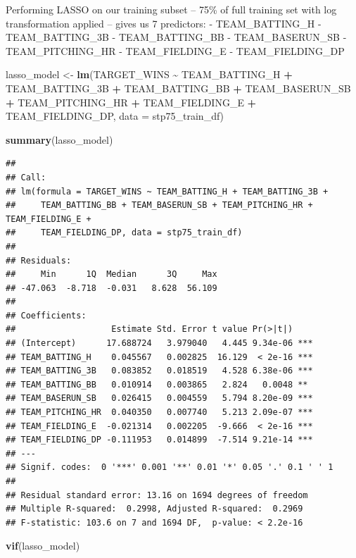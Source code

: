 \documentclass[
]{article}
\newenvironment{Shaded}{\begin{snugshade}}{\end{snugshade}}
\newcommand{\AttributeTok}[1]{\textcolor[rgb]{0.13,0.29,0.53}{#1}}
\newcommand{\FunctionTok}[1]{\textcolor[rgb]{0.13,0.29,0.53}{\textbf{#1}}}
\newcommand{\NormalTok}[1]{#1}
\newcommand{\OtherTok}[1]{\textcolor[rgb]{0.56,0.35,0.01}{#1}}
\newcommand{\SpecialCharTok}[1]{\textcolor[rgb]{0.81,0.36,0.00}{\textbf{#1}}}
\begin{document}
Performing LASSO on our training subset -- 75\% of full training set
with log transformation applied -- gives us 7 predictors: -
TEAM\_BATTING\_H - TEAM\_BATTING\_3B - TEAM\_BATTING\_BB -
TEAM\_BASERUN\_SB - TEAM\_PITCHING\_HR - TEAM\_FIELDING\_E -
TEAM\_FIELDING\_DP

\begin{Shaded}
\begin{Highlighting}[]
\NormalTok{lasso\_model }\OtherTok{\textless{}{-}} \FunctionTok{lm}\NormalTok{(TARGET\_WINS }\SpecialCharTok{\textasciitilde{}}\NormalTok{ TEAM\_BATTING\_H }\SpecialCharTok{+}\NormalTok{ TEAM\_BATTING\_3B }\SpecialCharTok{+}\NormalTok{ TEAM\_BATTING\_BB }\SpecialCharTok{+}\NormalTok{ TEAM\_BASERUN\_SB }\SpecialCharTok{+}\NormalTok{ TEAM\_PITCHING\_HR }\SpecialCharTok{+}\NormalTok{ TEAM\_FIELDING\_E }\SpecialCharTok{+}\NormalTok{ TEAM\_FIELDING\_DP, }\AttributeTok{data =}\NormalTok{ stp75\_train\_df)}

\FunctionTok{summary}\NormalTok{(lasso\_model)}
\end{Highlighting}
\end{Shaded}

\begin{verbatim}
## 
## Call:
## lm(formula = TARGET_WINS ~ TEAM_BATTING_H + TEAM_BATTING_3B + 
##     TEAM_BATTING_BB + TEAM_BASERUN_SB + TEAM_PITCHING_HR + TEAM_FIELDING_E + 
##     TEAM_FIELDING_DP, data = stp75_train_df)
## 
## Residuals:
##     Min      1Q  Median      3Q     Max 
## -47.063  -8.718  -0.031   8.628  56.109 
## 
## Coefficients:
##                   Estimate Std. Error t value Pr(>|t|)    
## (Intercept)      17.688724   3.979040   4.445 9.34e-06 ***
## TEAM_BATTING_H    0.045567   0.002825  16.129  < 2e-16 ***
## TEAM_BATTING_3B   0.083852   0.018519   4.528 6.38e-06 ***
## TEAM_BATTING_BB   0.010914   0.003865   2.824   0.0048 ** 
## TEAM_BASERUN_SB   0.026415   0.004559   5.794 8.20e-09 ***
## TEAM_PITCHING_HR  0.040350   0.007740   5.213 2.09e-07 ***
## TEAM_FIELDING_E  -0.021314   0.002205  -9.666  < 2e-16 ***
## TEAM_FIELDING_DP -0.111953   0.014899  -7.514 9.21e-14 ***
## ---
## Signif. codes:  0 '***' 0.001 '**' 0.01 '*' 0.05 '.' 0.1 ' ' 1
## 
## Residual standard error: 13.16 on 1694 degrees of freedom
## Multiple R-squared:  0.2998, Adjusted R-squared:  0.2969 
## F-statistic: 103.6 on 7 and 1694 DF,  p-value: < 2.2e-16
\end{verbatim}

\begin{Shaded}
\begin{Highlighting}[]
\FunctionTok{vif}\NormalTok{(lasso\_model)}
\end{Highlighting}
\end{Shaded}
\end{document}
